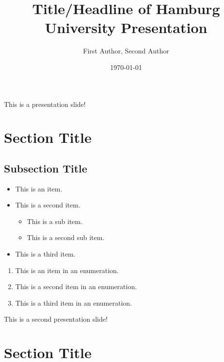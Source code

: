 \documentclass[aspectratio=169,17pt]{tuhh_presentation}
\title{Title/Headline of Hamburg University Presentation}
\date{\today}
\author[Corresponding Author]{First Author, Second Author}
\institute{Corresponding Authors Institute}
\begin{document}
\titlepage


\begin{frame}[agenda]
    \tableofcontents
\end{frame}



\begin{frame}{This is a presentation slide!}
    \section{Section Title}
    \subsection{Subsection Title}
    
    \begin{minipage}{0.49\textwidth}
        \begin{itemize}
            \item This is an item.
            \item This is a second item.
            \begin{itemize}
                \item This is a sub item.
                \item This is a second sub item.
            \end{itemize}
            \item This is a third item.
        \end{itemize}
    \end{minipage}
    \begin{minipage}{0.49\textwidth}
        \begin{enumerate}
            \item This is an item in an enumeration.
            \item This is a second item in an enumeration.
            \item This is a third item in an enumeration.
        \end{enumerate}
    \end{minipage}
\end{frame}

\begin{frame}{This is a second presentation slide!}
    \section{Section Title}





\end{frame}

\finalpage
\end{document}
